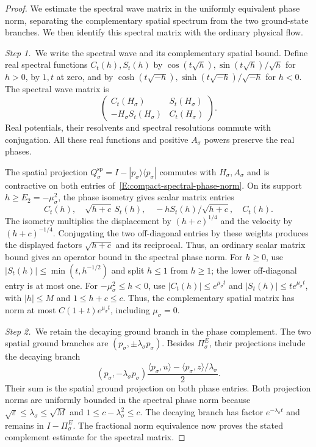 \begin{proof}
  We estimate the spectral wave matrix in the uniformly equivalent phase norm,
  separating the complementary spatial spectrum from the two ground-state
  branches. We then identify this spectral matrix with the ordinary physical
  flow.

  \medskip
  \noindent\textit{Step 1.~}We write the spectral wave and its complementary
  spatial bound.
  Define real spectral functions $C_t(h),S_t(h)$ by $\cos(t\sqrt h),\sin(t\sqrt
  h)/\sqrt h$ for $h > 0$, by $1,t$ at zero, and by
  $\cosh(t\sqrt{-h}),\sinh(t\sqrt{-h})/\sqrt{-h}$ for $h < 0$. The spectral wave
  matrix is
  \begin{equation}\label{E:compact-spectral-wave}
    \begin{pmatrix}
      C_t(H_\sigma)&S_t(H_\sigma)\\
      -H_\sigma S_t(H_\sigma)&C_t(H_\sigma)
    \end{pmatrix}.
  \end{equation}
  Real potentials, their resolvents and spectral resolutions commute with
  conjugation. All these real functions and positive $A_\sigma$ powers preserve
  the real phases.

  The spatial projection $Q_\sigma^{\mathrm{sp}} = I-|p_\sigma\rangle\langle
  p_\sigma|$ commutes with $H_\sigma,A_\sigma$ and is contractive on both
  entries of~\eqref{E:compact-spectral-phase-norm}. On its support $h \ge E_2 =
  -\mu_\sigma^2$, the phase isometry gives scalar matrix entries
  \[
    C_t(h),\quad \sqrt{h+c}\,S_t(h),\quad
    -hS_t(h)/\sqrt{h+c},\quad C_t(h).
  \]
  The isometry multiplies the displacement by $(h+c)^{1/4}$ and the velocity
  by $(h+c)^{-1/4}$. Conjugating the two off-diagonal entries by these weights
  produces the displayed factors $\sqrt{h+c}$ and its reciprocal. Thus, an
  ordinary scalar matrix bound gives an operator bound in the spectral phase
  norm.
  For $h \ge 0$, use $|S_t(h)| \le \min(t,h^{-1/2})$ and split $h \le 1$ from $h
  \ge 1$; the lower off-diagonal entry is at most one. For $-\mu_\sigma^2 \le h
  < 0$, use $|C_t(h)| \le e^{\mu_\sigma t}$ and $|S_t(h)| \le t e^{\mu_\sigma
  t}$, with $|h| \le M$ and $1 \le h+c \le c$. Thus, the complementary spatial
  matrix has norm at most $C(1+t)e^{\mu_\sigma t}$, including $\mu_\sigma = 0$.


  \medskip
  \noindent\textit{Step 2.~}We retain the decaying ground branch in the phase
  complement.
  The two spatial ground branches are $(p_\sigma,\pm\lambda_\sigma p_\sigma)$.
  Besides $\Pi_\sigma^E$, their projections include the decaying branch
  \[
    (p_\sigma,-\lambda_\sigma p_\sigma)
    \frac{\langle p_\sigma,u\rangle
    -\langle p_\sigma,z\rangle/\lambda_\sigma}{2}.
  \]
  Their sum is the spatial ground projection on both phase entries. Both
  projection norms are uniformly bounded in the spectral phase norm because
  $\sqrt\varepsilon \le \lambda_\sigma \le \sqrt M$ and $1 \le
  c-\lambda_\sigma^2 \le c$. The decaying branch has factor $e^{-\lambda_\sigma
  t}$ and remains in $I-\Pi_\sigma^E$. The fractional norm equivalence now
  proves the stated complement estimate for the spectral matrix.



\end{proof}
